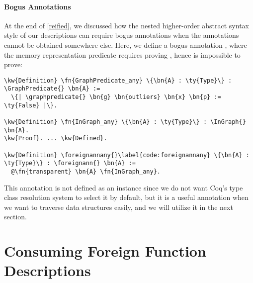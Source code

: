 






\newcommand{\foreignannany}{\hyperref[code:foreignannany]{\fn{foreign\_\linebreak[0]ann\_\linebreak[0]any}}}

\paragraph*{Bogus Annotations}
At the end of \autoref{reified}, we discussed how the nested higher-order abstract syntax style of our descriptions can require bogus annotations when the annotations cannot be obtained somewhere else. Here, we define a bogus \foreignann{} annotation \foreignannany{}, where the memory representation predicate requires proving , hence is impossible to prove:

\begin{Verbatim}
\kw{Definition} \fn{GraphPredicate_any} \{\bn{A} : \ty{Type}\} : \GraphPredicate{} \bn{A} :=
  \{| \graphpredicate{} \bn{g} \bn{outliers} \bn{x} \bn{p} := \ty{False} |\}.

\kw{Definition} \fn{InGraph_any} \{\bn{A} : \ty{Type}\} : \InGraph{} \bn{A}. 
\kw{Proof}. ... \kw{Defined}.

\kw{Definition} \foreignannany{}\label{code:foreignannany} \{\bn{A} : \ty{Type}\} : \foreignann{} \bn{A} :=
  @\fn{transparent} \bn{A} \fn{InGraph_any}.
\end{Verbatim}
This annotation is not defined as an instance since we do not want Coq's type class resolution system to select it by default, but it is a useful annotation when we want to traverse \reified{} data structures easily, and we will utilize it in the next section.

\section{Consuming Foreign Function Descriptions}

